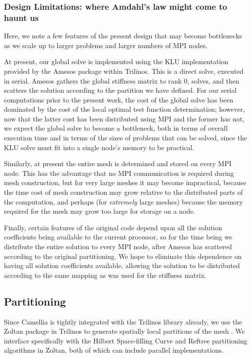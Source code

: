 \documentclass{article}
\begin{document}
\subsubsection{Design Limitations: where Amdahl's law might come to haunt us}
Here, we note a few features of the present design that may become bottlenecks as we scale up to larger problems and larger numbers of MPI nodes.

At present, our global solve is implemented using the KLU implementation provided by the Amesos package within Trilinos.  This is a direct solve, executed in serial.  Amesos gathers the global stiffness matrix to rank 0, solves, and then scatters the solution according to the partition we have defined.  For our serial computations prior to the present work, the cost of the global solve has been dominated by the cost of the local optimal test function determination; however, now that the latter cost has been distributed using MPI and the former has not, we expect the global solve to become a bottleneck, both in terms of overall execution time and in terms of the sizes of problems that can be solved, since the KLU solve must fit into a single node's memory to be practical.

Similarly, at present the entire mesh is determined and stored on every MPI node.  This has the advantage that no MPI communication is required during mesh construction, but for very large meshes it may become impractical, because the time cost of mesh construction may grow relative to the distributed parts of the computation, and perhaps (for \emph{extremely} large meshes) because the memory required for the mesh may grow too large for storage on a node.

Finally, certain features of the original code depend upon all the solution coefficients being available to the current processor, so for the time being we distribute the entire solution to every MPI node, after Amesos has scattered according to the original partitioning.  We hope to eliminate this dependence on having all solution coefficients available, allowing the solution to be distributed according to the same mapping as was used for the stiffness matrix.

\subsection{Partitioning}

Since Camellia is tightly integrated with the Trilinos library already, we use the Zoltan package in Trilinos to generate spatially local partitions of the mesh \cite{ZoltanOverviewArticle}. We interface specifically with the Hilbert Space-filling Curve and Reftree partitioning algorithms in Zoltan, both of which can include parallel implementations. 
\end{document}
